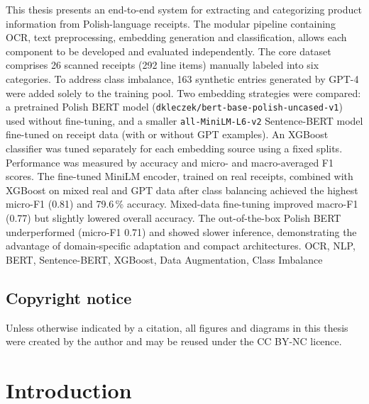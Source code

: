 \documentclass{SGGW-thesis-EN}
\begin{document}
{This thesis presents an end-to-end system for extracting and categorizing product information from Polish-language receipts. 
The modular pipeline containing OCR, text preprocessing, embedding generation and classification, allows each component to be developed and evaluated independently. 
The core dataset comprises 26 scanned receipts (292 line items) manually labeled into six categories. 
To address class imbalance, 163 synthetic entries generated by GPT-4 were added solely to the training pool.
Two embedding strategies were compared: a pretrained Polish BERT model (\texttt{dkleczek/bert-base-polish-uncased-v1}) used without fine-tuning, 
and a smaller \texttt{all-MiniLM-L6-v2} Sentence-BERT model fine-tuned on receipt data (with or without GPT examples). 
An XGBoost classifier was tuned separately for each embedding source using a fixed splits. 
Performance was measured by accuracy and micro- and macro-averaged F1 scores.
The fine-tuned MiniLM encoder, trained on real receipts, combined with XGBoost on mixed real and GPT data after class balancing achieved the highest 
micro-F1 (0.81) and 79.6\,\% accuracy. Mixed-data fine-tuning improved macro-F1 (0.77) but slightly lowered overall accuracy. 
The out-of-the-box Polish BERT underperformed (micro-F1 0.71) and showed slower inference, 
demonstrating the advantage of domain-specific adaptation and compact architectures.}
{OCR, NLP, BERT, Sentence-BERT, XGBoost, Data Augmentation, Class Imbalance}


\tableofcontents

\section*{Copyright notice}
\noindent
Unless otherwise indicated by a citation, all figures and diagrams in this thesis were created by the author and may be reused under the CC BY-NC licence.


\startchapterfromoddpage %

\chapter{Introduction}
\end{document}
